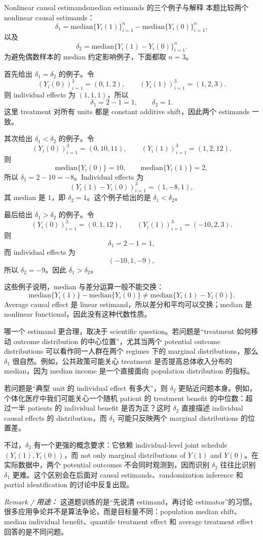 \begin{exercisesolution}{Nonlinear causal estimands}{median estimands 的三个例子与解释}
本题比较两个 nonlinear causal estimands：
\[
\delta_1=\text{median}\{Y_i(1)\}_{i=1}^n-\text{median}\{Y_i(0)\}_{i=1}^n,
\]
以及
\[
\delta_2=\text{median}\{Y_i(1)-Y_i(0)\}_{i=1}^n.
\]
为避免偶数样本的 median 约定影响例子，下面都取 $n=3$。

首先给出 $\delta_1=\delta_2$ 的例子。令
\[
(Y_i(0))_{i=1}^3=(0,1,2),\qquad (Y_i(1))_{i=1}^3=(1,2,3).
\]
则 individual effects 为 $(1,1,1)$，所以
\[
\delta_1=2-1=1,\qquad \delta_2=1.
\]
这里 treatment 对所有 units 都是 constant additive shift，因此两个 estimands 一致。

其次给出 $\delta_1<\delta_2$ 的例子。令
\[
(Y_i(0))_{i=1}^3=(0,10,11),\qquad (Y_i(1))_{i=1}^3=(1,2,12).
\]
则
\[
\text{median}\{Y_i(0)\}=10,\qquad \text{median}\{Y_i(1)\}=2,
\]
所以 $\delta_1=2-10=-8$。Individual effects 为
\[
(Y_i(1)-Y_i(0))_{i=1}^3=(1,-8,1),
\]
其 median 是 $1$，即 $\delta_2=1$。这个例子给出的是 $\delta_1<\delta_2$。

最后给出 $\delta_1>\delta_2$ 的例子。令
\[
(Y_i(0))_{i=1}^3=(0,1,12),\qquad (Y_i(1))_{i=1}^3=(-10,2,3).
\]
则
\[
\delta_1=2-1=1,
\]
而 individual effects 为
\[
(-10,1,-9),
\]
所以 $\delta_2=-9$。因此 $\delta_1>\delta_2$。

这些例子说明，median 与差分运算一般不能交换：
\[
\text{median}\{Y_i(1)\}-\text{median}\{Y_i(0)\}
\neq
\text{median}\{Y_i(1)-Y_i(0)\}.
\]
Average causal effect 是 linear estimand，所以差分和平均可以交换；median 是 nonlinear functional，因此没有这种代数性质。

哪一个 estimand 更合理，取决于 scientific question。若问题是“treatment 如何移动 outcome distribution 的中心位置”，尤其当两个 potential outcome distributions 可以看作同一人群在两个 regimes 下的 marginal distributions，那么 $\delta_1$ 很自然。例如，公共政策可能关心 treatment 是否提高总体收入分布的 median，因为 median income 是一个直接面向 population distribution 的指标。

若问题是“典型 unit 的 individual effect 有多大”，则 $\delta_2$ 更贴近问题本身。例如，个体化医疗中我们可能关心一个随机 patient 的 treatment benefit 的中位数：超过一半 patients 的 individual benefit 是否为正？这时 $\delta_2$ 直接描述 individual causal effects 的 distribution，而 $\delta_1$ 可能只反映两个 marginal distributions 的位置差。

不过，$\delta_2$ 有一个更强的概念要求：它依赖 individual-level joint schedule $(Y_i(1),Y_i(0))$，而 not only marginal distributions of $Y(1)$ and $Y(0)$。在实际数据中，两个 potential outcomes 不会同时观测到，因而识别 $\delta_2$ 往往比识别 $\delta_1$ 更难。这个区别会在后面对 causal estimands、randomization inference 和 partial identification 的讨论中反复出现。

\emph{Remark / 用途：} 这道题训练的是“先说清 estimand，再讨论 estimator”的习惯。很多应用争论并不是算法争论，而是目标量不同：population median shift、median individual benefit、quantile treatment effect 和 average treatment effect 回答的是不同问题。
\end{exercisesolution}

